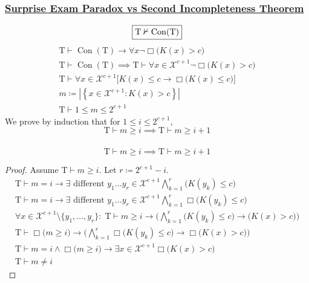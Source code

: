 \documentclass[UTF8,11pt,colorlinks,compress,openany]{beamer}%
\begin{document}
\begin{frame}\frametitle{\href{http://www.ams.org/notices/201011/rtx101101454p.pdf}{Surprise Exam Paradox vs Second Incompleteness Theorem}}
	\[\fbox{$\mathrm{T}\nvdash\operatorname{Con}(\mathrm{T})$}\]
	\begin{gather*}\label{chaitin_con}
	\mathrm{T}\vdash\operatorname{Con}(\mathrm{T})\to\forall x\neg\Box \big(K(x)>c\big)\tag{Chaitin}\\
	\mathrm{T}\vdash\operatorname{Con}(\mathrm{T})\implies\mathrm{T}\vdash\forall x\in\mathcal{X}^{c+1}\neg\Box \big(K(x)>c\big)\\
	\mathrm{T}\vdash\forall x\in\mathcal{X}^{c+1}\big[K(x)\leq c\to\Box \big(K(x)\leq c\big)\big]\tag{$\Sigma_1$-complete}\\
	m\coloneqq \left|\left\{x\in\mathcal{X}^{c+1}: K(x)>c\right\}\right|\\
	\mathrm{T}\vdash 1\leq m\leq 2^{c+1}
	\end{gather*}
	We prove by induction that for $1\leq i\leq 2^{c+1}$,
	\[\mathrm{T}\vdash m\geq i\implies\mathrm{T}\vdash m\geq i+1\]
\end{frame}

\begin{frame}\frametitle{}
	\[\mathrm{T}\vdash m\geq i\implies\mathrm{T}\vdash m\geq i+1\]
	\begin{proof}
		Assume $\mathrm{T}\vdash m\geq i$. Let $r\coloneqq 2^{c+1}-i$.
		\begin{gather*}
		\mathrm{T}\vdash m=i\to\exists\mbox{ different } y_1\dots y_r\in\mathcal{X}^{c+1}\bigwedge\limits_{k=1}^r\big(K(y_k)\leq c\big)\\
		\mathrm{T}\vdash m=i\to\exists\mbox{ different } y_1\dots y_r\in\mathcal{X}^{c+1}\bigwedge\limits_{k=1}^r\Box \big(K(y_k)\leq c\big)\\
		\forall x\in\mathcal{X}^{c+1}\setminus\!\{y_1,\dots,y_r\}:\;\mathrm{T}\vdash m\geq i\to\bigg(\bigwedge\limits_{k=1}^r\big(K(y_k)\leq c\big)\to\big(K(x)>c\big)\bigg)\\
		\mathrm{T}\vdash\Box \big(m\geq i\big)\to\bigg(\bigwedge\limits_{k=1}^r\Box \big(K(y_k)\leq c\big)\to\Box \big(K(x)>c\big)\bigg)\\
		\mathrm{T}\vdash m=i\wedge\Box \big(m\geq i\big)\to\exists x\in\mathcal{X}^{c+1}\Box \big(K(x)>c\big)\\
		\mathrm{T}\vdash m\neq i
		\end{gather*}
		\vspace{-4ex}
	\end{proof}
\end{frame}
\end{document}
